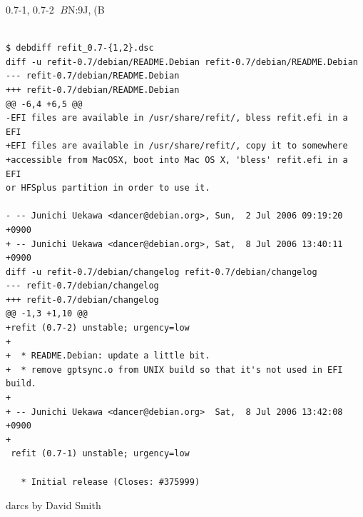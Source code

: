 \documentclass[cjk,dvipdfm,12pt]{beamer}
\begin{document}
{{{{{{{\begin{frame}[containsverbatim]{0.7-1, 0.7-2 $B$N:9J,(B}

{\tiny

\begin{verbatim}

$ debdiff refit_0.7-{1,2}.dsc
diff -u refit-0.7/debian/README.Debian refit-0.7/debian/README.Debian
--- refit-0.7/debian/README.Debian
+++ refit-0.7/debian/README.Debian
@@ -6,4 +6,5 @@
-EFI files are available in /usr/share/refit/, bless refit.efi in a EFI
+EFI files are available in /usr/share/refit/, copy it to somewhere
+accessible from MacOSX, boot into Mac OS X, 'bless' refit.efi in a EFI
or HFSplus partition in order to use it.

- -- Junichi Uekawa <dancer@debian.org>, Sun,  2 Jul 2006 09:19:20 +0900
+ -- Junichi Uekawa <dancer@debian.org>, Sat,  8 Jul 2006 13:40:11 +0900
diff -u refit-0.7/debian/changelog refit-0.7/debian/changelog
--- refit-0.7/debian/changelog
+++ refit-0.7/debian/changelog
@@ -1,3 +1,10 @@
+refit (0.7-2) unstable; urgency=low
+
+  * README.Debian: update a little bit.
+  * remove gptsync.o from UNIX build so that it's not used in EFI build.
+
+ -- Junichi Uekawa <dancer@debian.org>  Sat,  8 Jul 2006 13:42:08 +0900
+
 refit (0.7-1) unstable; urgency=low

   * Initial release (Closes: #375999)
\end{verbatim}
} 
\end{frame}

\begin{frame}{SCM$B$G$O$J$$%
Debian$B$N%
$B$7$F4IM}$9$k%

\begin{itemize}
 \item dpatch
 \item dbs
 \item quilt
\end{itemize}
 
\end{frame}



\begin{frame}

 darcs by David Smith
\end{frame}

}}}}}}}
\end{document}
